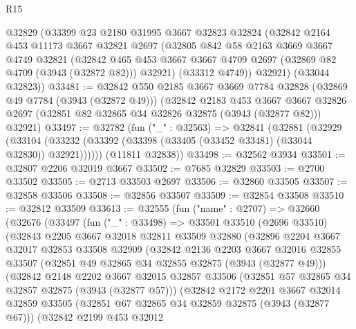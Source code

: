 \begin{lexlean}{R15}
\begin{coremodule}
    @32829
    (@33399
      @23
      @2180
      @31995
      @3667
      @32823
      @32824
      (@32842
        @2164
        @453
        @11173
        @3667
        @32821
        @2697
        (@32805
          @842
          @58
          @2163
          @3669
          @3667
          @4749
          @32821
          (@32842 @465 @453 @3667 @3667 @4709 @2697 (@32869 @82 @4709 (@3943 (@32872 @82))) @32921)
          (@33312 @4749))
        @32921)
      (@33044 @32823))
@33481 := @32842
    @550
    @2185
    @3667
    @3669
    @7784
    @32828
    (@32869 @49 @7784 (@3943 (@32872 @49)))
    (@32842
      @2183
      @453
      @3667
      @3667
      @32826
      @2697
      (@32851 @82 @32865 @34 @32826 @32875 (@3943 (@32877 @82)))
      @32921)
@33497 := @32782
    (fun ("_" : @32563) =>
    @32841
      (@32881
        (@32929
          (@33104 (@33232 (@33392 (@33398 (@33405 (@33452 @33481) (@33044 @32830)) @32921))))))
      (@11811 @32838))
@33498 := @32562 @3934
@33501 := @32807 @2206 @32019 @3667
@33502 := @7685 @32829
@33503 := @2700 @33502
@33505 := @2713 @33503 @2697
@33506 := @32860 @33505
@33507 := @32858 @33506
@33508 := @32856 @33507
@33509 := @32854 @33508
@33510 := @32812 @33509
@33613 := @32555
    (fun ("name" : @2707) =>
    @32660
      (@32676
        (@33497
          (fun ("_" : @33498) =>
          @33501
            @33510
            (@2696 @33510)
            (@32843
              @2205
              @3667
              @32018
              @32811
              @33509
              @32880
              (@32896
                @2204
                @3667
                @32017
                @32853
                @33508
                @32909
                (@32842
                  @2136
                  @2203
                  @3667
                  @32016
                  @32855
                  @33507
                  (@32851 @49 @32865 @34 @32855 @32875 (@3943 (@32877 @49)))
                  (@32842
                    @2148
                    @2202
                    @3667
                    @32015
                    @32857
                    @33506
                    (@32851 @57 @32865 @34 @32857 @32875 (@3943 (@32877 @57)))
                    (@32842
                      @2172
                      @2201
                      @3667
                      @32014
                      @32859
                      @33505
                      (@32851 @67 @32865 @34 @32859 @32875 (@3943 (@32877 @67)))
                      (@32842
                        @2199
                        @453
                        @32012

\end{coremodule}
\end{lexlean}
